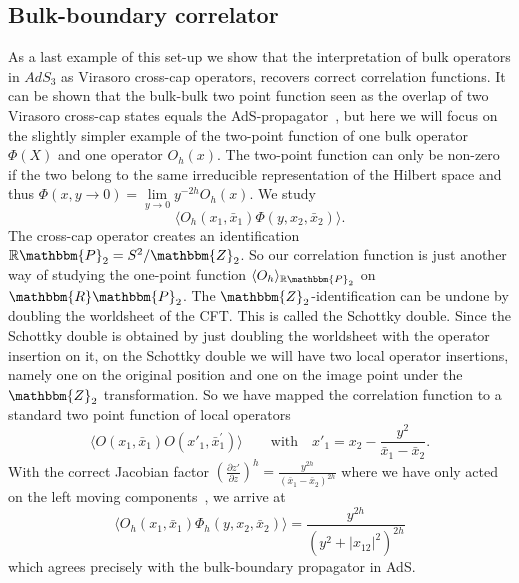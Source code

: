 \documentclass{PoS}
\newcommand{\LF}{\left(}
\newcommand{\RF}{\right)}
\begin{document}
\subsection{Bulk-boundary correlator}
As a last example of this set-up we show that the interpretation of bulk operators in $AdS_3$ as Virasoro cross-cap operators, recovers correct correlation functions. It can be shown that the bulk-bulk two point function seen as the overlap of two Virasoro cross-cap states equals the AdS-propagator~\cite{Verlinde:2015qfa,Lewkowycz:2016ukf}, but here we will focus on the slightly simpler example of the two-point function of one bulk operator $\Phi(X)$ and one operator $O_h(x)$. The two-point function can only be non-zero if the two belong to the same irreducible representation of the Hilbert space and thus $\Phi(x,y\rightarrow 0)= \lim\limits_{y\rightarrow 0} y^{-2h}O_h(x)$. We study
\begin{equation}
\langle O_h(x_1,\bar{x}_1) \Phi (y, x_2,\bar{x}_2)\rangle.
\end{equation}
The cross-cap operator creates an identification $\mathbb{R}\mathbbm{P}_2 = S^2/\mathbbm{Z}_2$. So our correlation function is just another way of studying the one-point function $\langle O_h\rangle_{\mathbb{R}\mathbbm{P}_2 }$ on $\mathbbm{R}\mathbbm{P}_2$. The $\mathbbm{Z}_2$-identification can be undone by doubling the worldsheet of the CFT. This is called the Schottky double. Since the Schottky double is obtained by just doubling the worldsheet with the operator insertion on it, on the Schottky double we will have two local operator insertions, namely one on the original position and one on the image point under the $\mathbbm{Z}_2$ transformation. So we have mapped the correlation function to a standard two point function of local operators
\begin{equation}
\langle O(x_1,\bar{x}_1) O(x'_1,\bar{x}^{'}_1)\rangle \qquad \text{with} \quad x'_1 = x_2 - \frac{y^2}{\bar{x}_1 - \bar{x}_2}.
\end{equation}
With the correct Jacobian factor $\LF \frac{\partial z'}{\partial z}\RF^h=\frac{y^{2h}}{(\bar{x}_1-\bar{x}_2)^{2h}}$ where we have only acted on the left moving components~\cite{Lewkowycz:2016ukf}, we arrive at 
\begin{equation}
\langle O_h(x_1,\bar{x}_1) \Phi_h (y, x_2,\bar{x}_2)\rangle = \frac{y^{2h}}{(y^2+ \left| x_{12}\right|^2)^{2h}}
\end{equation}
which agrees precisely with the bulk-boundary propagator in AdS.
\end{document}

